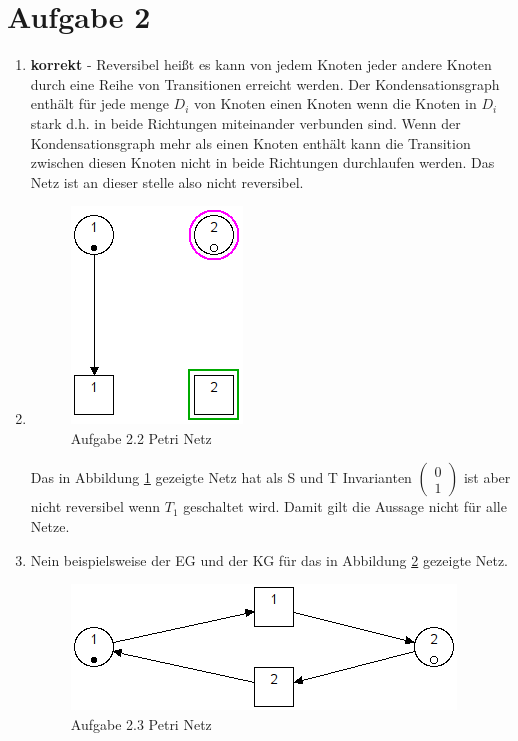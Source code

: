 \documentclass[10pt]{scrartcl}
\begin{document}
\section{Aufgabe 2}
\begin{enumerate}

	\item \textbf{korrekt} - Reversibel heißt es kann von jedem Knoten jeder andere Knoten durch eine Reihe von Transitionen erreicht werden. Der Kondensationsgraph enthält für jede menge $D_i$ von Knoten einen Knoten wenn die Knoten in $D_i$ stark d.h. in beide Richtungen miteinander verbunden sind. Wenn der Kondensationsgraph mehr als einen Knoten enthält kann die Transition zwischen diesen Knoten nicht in beide Richtungen durchlaufen werden. Das Netz ist an dieser stelle also nicht reversibel.
	
	
	\item 	\begin{figure}[H]
    			\centering
				\includegraphics[scale=0.5]{aufg2.png}		
            	\caption{Aufgabe 2.2 Petri Netz}
            	\label{petri:aufg22}
			\end{figure}
	Das in Abbildung \ref{petri:aufg22} gezeigte Netz hat als S und T Invarianten $\begin{pmatrix} 
						 0 \\
						 1 \end{pmatrix}$ ist aber nicht reversibel wenn $T_1$ geschaltet wird. Damit gilt die Aussage nicht für alle Netze.
						 
						 
	\item Nein beispielsweise der EG und der KG für das in Abbildung \ref{petri:aufg23} gezeigte Netz.
	
	\begin{figure}[H]
    			\centering
				\includegraphics[scale=0.5]{aufg23.png}		
            	\caption{Aufgabe 2.3 Petri Netz}
            	\label{petri:aufg23}
			\end{figure}	
	

\end{enumerate}
\end{document}
